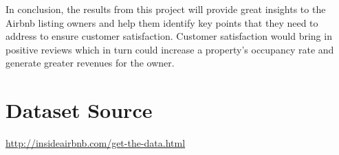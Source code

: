 \documentclass[11pt]{article}
\begin{document}
\noindent In conclusion, the results from this project will provide great insights to the Airbnb listing owners and help them identify key points that they need to address to ensure customer satisfaction. Customer satisfaction would bring in positive reviews which in turn could increase a property’s occupancy rate and generate greater revenues for the owner.

\section*{Dataset Source}

\url{http://insideairbnb.com/get-the-data.html}
\end{document}
